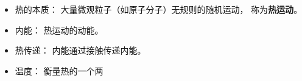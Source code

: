 
\begin{issues}
\issueDraft
\end{issues}

\begin{itemize}
\item 热的本质： 大量微观粒子（如原子分子）无规则的随机运动， 称为\textbf{热运动}。
\item 内能： 热运动的动能。
\item 热传递： 内能通过接触传递内能。
\item 温度： 衡量热的一个两
\end{itemize}
